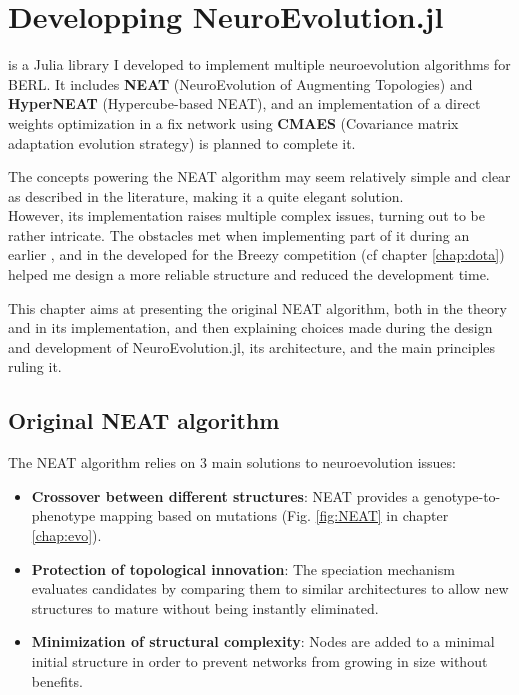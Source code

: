 \chapter{Developping NeuroEvolution.jl}
\label{chap:neuroevo}

 is a Julia library I developed to implement multiple neuroevolution algorithms for BERL. It includes \textbf{NEAT} (NeuroEvolution of Augmenting Topologies) and \textbf{HyperNEAT} (Hypercube-based NEAT), and an implementation of a direct weights optimization in a fix network using \textbf{CMAES} (Covariance matrix adaptation evolution strategy) is planned to complete it. 

The concepts powering the NEAT algorithm may seem relatively simple and clear as described in the literature, making it a quite elegant solution. \\
However, its implementation raises multiple complex issues, turning out to be rather intricate. The obstacles met when implementing part of it during an earlier ,  and in the  developed for the Breezy competition (cf chapter \ref{chap:dota}) helped me design a more reliable structure and reduced the development time.

This chapter aims at presenting the original NEAT algorithm, both in the theory and in its implementation, and then explaining choices made during the design and development of NeuroEvolution.jl, its architecture, and the main principles ruling it. 

\section{Original NEAT algorithm}
\label{sec:og-neat}

The NEAT algorithm relies on 3 main solutions to neuroevolution issues:
\begin{itemize}
    \item \textbf{Crossover between different structures}: NEAT provides a genotype-to-phenotype mapping based on mutations (Fig. \ref{fig:NEAT} in chapter \ref{chap:evo}).
    \item \textbf{Protection of topological innovation}: The speciation mechanism evaluates candidates by comparing them to similar architectures to allow new structures to mature without being instantly eliminated. 
    \item \textbf{Minimization of structural complexity}: Nodes are added to a minimal initial structure in order to prevent networks from growing in size without benefits.
\end{itemize}

